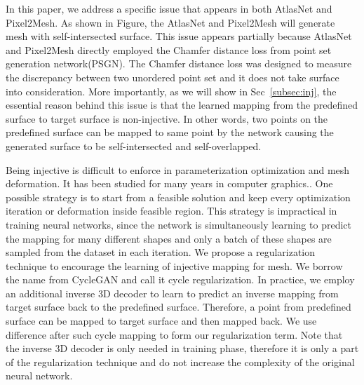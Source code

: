 In this paper, we address a specific issue that appears in both AtlasNet\cite{atlasnet} and Pixel2Mesh\cite{pixel2mesh}. As shown in Figure, the AtlasNet and Pixel2Mesh will generate mesh with self-intersected surface. This issue appears partially because AtlasNet and Pixel2Mesh directly employed the Chamfer distance loss from point set generation network(PSGN)\cite{PSGN}. The Chamfer distance loss was designed to measure the discrepancy between two unordered point set and it does not take surface into consideration. More importantly, as we will show in Sec~\ref{subsec:inj}, the essential reason behind this issue is that the learned mapping from the predefined surface to target surface is non-injective. In other words, two points on the predefined surface can be mapped to same point by the network causing the generated surface to be self-intersected and self-overlapped. 

Being injective is difficult to enforce in parameterization optimization and mesh deformation. It has been studied for many years in computer graphics.. One possible strategy is to start from a feasible solution and keep every optimization iteration or deformation inside feasible region. This strategy is impractical in training neural networks, since the network is simultaneously learning to predict the mapping for many different shapes and only a batch of these shapes are sampled from the dataset in each iteration. We propose a regularization technique to encourage the learning of injective mapping for mesh. We borrow the name from CycleGAN\cite{CycleGAN} and call it cycle regularization. In practice, we employ an additional inverse 3D decoder to learn to predict an inverse mapping from target surface back to the predefined surface. Therefore, a point from predefined surface can be mapped to target surface and then mapped back. We use difference after such cycle mapping to form our regularization term. Note that the inverse 3D decoder is only needed in training phase, therefore it is only a part of the regularization technique and do not increase the complexity of the original neural network.

 